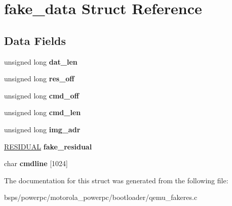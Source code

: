 \hypertarget{structfake__data}{}\section{fake\+\_\+data Struct Reference}
\label{structfake__data}
\subsection*{Data Fields}
\begin{DoxyCompactItemize}
\item 
\mbox{\label{structfake__data_abb787aeb09324568229bfdc24ec0ee01}} 
unsigned long {\bfseries dat\+\_\+len}
\item 
\mbox{\label{structfake__data_a0abb738bcd8e0b8e6972ee44dda652b9}} 
unsigned long {\bfseries res\+\_\+off}
\item 
\mbox{\label{structfake__data_a30d36a34c46bb2212d585a12dd909a46}} 
unsigned long {\bfseries cmd\+\_\+off}
\item 
\mbox{\label{structfake__data_a4aeffd976a815f261a42ab21dfc91024}} 
unsigned long {\bfseries cmd\+\_\+len}
\item 
\mbox{\label{structfake__data_a1122d68c72811cc154616a396310184a}} 
unsigned long {\bfseries img\+\_\+adr}
\item 
\mbox{\label{structfake__data_aae23c2c3cf7a1c0bfd7d62b7aa395dca}} 
\mbox{\hyperlink{struct__RESIDUAL}{R\+E\+S\+I\+D\+U\+AL}} {\bfseries fake\+\_\+residual}
\item 
\mbox{\label{structfake__data_a0fb67cae544908ef728bc4f0e336b5a0}} 
char {\bfseries cmdline} \mbox{[}1024\mbox{]}
\end{DoxyCompactItemize}


The documentation for this struct was generated from the following file\+:\begin{DoxyCompactItemize}
\item 
bsps/powerpc/motorola\+\_\+powerpc/bootloader/qemu\+\_\+fakeres.\+c\end{DoxyCompactItemize}
